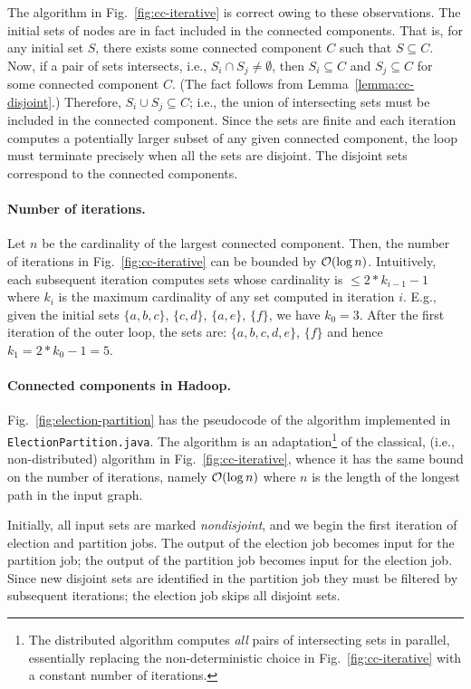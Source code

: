\documentclass{article}[12pt]
\numberwithin{figure}{section}
\begin{document}
The algorithm in Fig.~\ref{fig:cc-iterative} is correct owing to these observations.  The initial sets of nodes are in fact
included in the connected components.  That is, for any initial set $S$, there exists some connected component $C$ such that $S \subseteq C$.
Now, if a pair of sets intersects, i.e., $S_i \cap S_j \neq \emptyset$, then $S_i \subseteq C$ and $S_j \subseteq C$ for some connected component $C$.
(The fact follows from Lemma~\ref{lemma:cc-disjoint}.)  Therefore, $S_i \cup S_j \subseteq C$; i.e., the union of intersecting sets must be included
in the connected component.  Since the sets are finite and each iteration computes a potentially larger subset of any given connected component, the
loop must terminate precisely when all the sets are disjoint.  The disjoint sets correspond to the connected components.

\paragraph{Number of iterations.}

Let $n$ be the cardinality of the largest connected component.  Then, the number of iterations in Fig.~\ref{fig:cc-iterative}
can be bounded by $\mathcal{O}(\log n)$.  Intuitively, each subsequent iteration computes sets whose cardinality is $\leq 2 * k_{i-1} - 1$
where $k_i$ is the maximum cardinality of any set computed in iteration $i$.
E.g., given the initial sets $\{a,b,c\}$, $\{c,d\}$, $\{a,e\}$, $\{f\}$, we have $k_0 = 3$.  After the first iteration of the outer loop, the sets
are: $\{a,b,c,d,e\}$, $\{f\}$ and hence $k_1 = 2 * k_0 -1 = 5$.

\paragraph{Connected components in Hadoop.}

Fig.~\ref{fig:election-partition} has the pseudocode of the algorithm implemented in \texttt{ElectionPartition.java}.
The algorithm is an adaptation\footnote{The distributed algorithm computes \emph{all} pairs of intersecting sets
in parallel, essentially replacing the non-deterministic choice in Fig.~\ref{fig:cc-iterative} with a constant number of iterations.} 
of the classical, (i.e., non-distributed) algorithm in Fig.~\ref{fig:cc-iterative}, whence it has the same
bound on the number of iterations, namely $\mathcal{O}(\log n)$ where $n$ is the length of the longest path in the input graph.

Initially, all input sets are marked \emph{nondisjoint}, and we begin the first iteration of election and partition jobs.
The output of the election job becomes input for the partition job; the output of the partition job becomes input for the election job.
Since new disjoint sets are identified in the partition job they must be filtered by subsequent iterations; the election job skips all disjoint sets.
\end{document}
